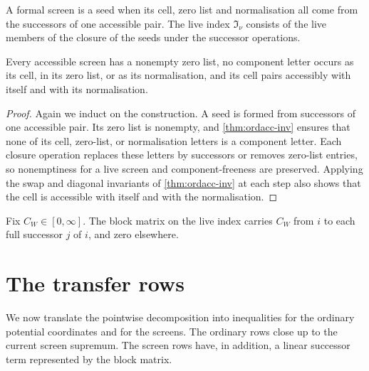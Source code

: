 \begin{definition}
\label{def:scracc}
\leanok
{}
A formal screen is a seed when its cell, zero list and normalisation all come from the
successors of one accessible pair. The live index $\mathfrak I_\nu$ consists of the live members
of the closure of the seeds under the successor operations.
\end{definition}

\begin{lemma}
\label{thm:scracc-inv}
\leanok
{}
Every accessible screen has a nonempty zero list, no component letter occurs as its cell, in its
zero list, or as its normalisation, and its cell pairs accessibly with itself and with its
normalisation.
\end{lemma}

\begin{proof}
\leanok
{}
Again we induct on the construction. A seed is formed from successors of one accessible pair. Its
zero list is nonempty, and \cref{thm:ordacc-inv} ensures that none of its cell, zero-list, or
normalisation letters is a component letter. Each closure operation replaces these letters by
successors or removes zero-list entries, so nonemptiness for a live screen and component-freeness
are preserved. Applying the swap and diagonal invariants of \cref{thm:ordacc-inv} at each step
also shows that the cell is accessible with itself and with the normalisation.
\end{proof}

\begin{definition}
\label{def:accN}
\leanok
{}
Fix $C_W\in[0,\infty]$. The block matrix on the live index carries $C_W$ from $i$ to each full
successor $j$ of $i$, and zero elsewhere.
\end{definition}

\section{The transfer rows}

We now translate the pointwise decomposition into inequalities for the ordinary potential
coordinates and for the screens. The ordinary rows close up to the current screen supremum. The
screen rows have, in addition, a linear successor term represented by the block matrix.

